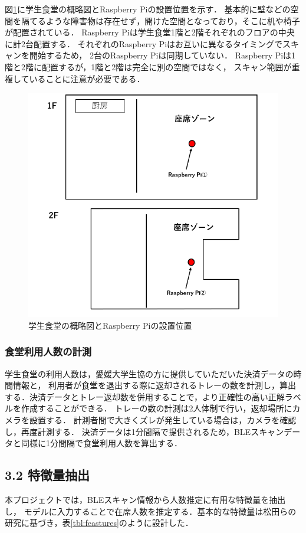 図\ref{raspi_place}に学生食堂の概略図とRaspberry Piの設置位置を示す．
基本的に壁などの空間を隔てるような障害物は存在せず，開けた空間となっており，そこに机や椅子が配置されている．
Raspberry Piは学生食堂1階と2階それぞれのフロアの中央に計2台配置する．
それぞれのRaspberry Piはお互いに異なるタイミングでスキャンを開始するため，
2台のRaspberry Piは同期していない．
Raspberry Piは1階と2階に配置するが，1階と2階は完全に別の空間ではなく，
スキャン範囲が重複していることに注意が必要である．
\begin{figure}[pt]
  \includegraphics[scale=0.4]{./images/raspi_place.png}
  \centering
  \caption{学生食堂の概略図とRaspberry Piの設置位置\label{raspi_place}}
\end{figure}

\subsubsection*{食堂利用人数の計測}
学生食堂の利用人数は，愛媛大学生協の方に提供していただいた決済データの時間情報と，
利用者が食堂を退出する際に返却されるトレーの数を計測し，算出する．決済データとトレー返却数を併用することで，より正確性の高い正解ラベルを作成することができる．
トレーの数の計測は2人体制で行い，返却場所にカメラを設置する．
計測者間で大きくズレが発生している場合は，カメラを確認し，再度計測する．
決済データは1分間隔で提供されるため，BLEスキャンデータと同様に1分間隔で食堂利用人数を算出する．

\subsection*{3.2 特徴量抽出}
本プロジェクトでは，BLEスキャン情報から人数推定に有用な特徴量を抽出し，
モデルに入力することで在席人数を推定する．基本的な特徴量は松田らの研究\cite{senkou}に基づき，表\ref{tbl:feastures}のように設計した．

